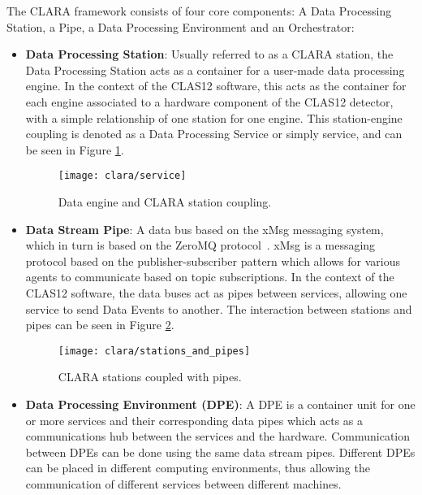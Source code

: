 The CLARA framework consists of four core components: A Data Processing Station, a Pipe, a Data Processing Environment and an Orchestrator:
    \begin{itemize}
        \item \textbf{Data Processing Station}: Usually referred to as a CLARA station, the Data Processing Station acts as a container for a user-made data processing engine.
        In the context of the CLAS12 software, this acts as the container for each engine associated to a hardware component of the CLAS12 detector, with a simple relationship of one station for one engine.
        This station-engine coupling is denoted as a Data Processing Service or simply service, and can be seen in Figure \ref{fig:clara_service}.
        
            \begin{figure}[ht]
                \centering
                \texttt{[image: clara/service]}
                \caption{\label{fig:clara_service} Data engine and CLARA station coupling.}
            \end{figure}
        
        \item \textbf{Data Stream Pipe}: A data bus based on the xMsg messaging system, which in turn is based on the ZeroMQ protocol~\cite{hintjens2013zeromq}.
        xMsg is a messaging protocol based on the publisher-subscriber pattern which allows for various agents to communicate based on topic subscriptions.
        In the context of the CLAS12 software, the data buses act as pipes between services, allowing one service to send Data Events to another.
        The interaction between stations and pipes can be seen in Figure \ref{fig:clara_station_pipe}.
        
            \begin{figure}[ht]
                \centering
                \texttt{[image: clara/stations\_and\_pipes]}
                \caption{\label{fig:clara_station_pipe} CLARA stations coupled with pipes.}
            \end{figure}
    
        \item \textbf{Data Processing Environment (DPE)}: A DPE is a container unit for one or more services and their corresponding data pipes which acts as a communications hub between the services and the hardware.
        Communication between DPEs can be done using the same data stream pipes.
        Different DPEs can be placed in different computing environments, thus allowing the communication of different services between different machines.
    

\end{itemize}
